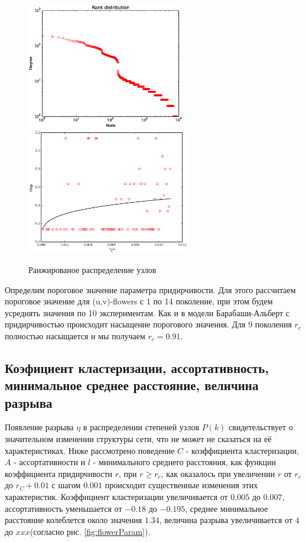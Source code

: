 \documentclass[10pt,aps,pra]{revtex4-1}
\begin{document}
\begin{figure}[H]
\label{fig:flowerRank}
\centering
\includegraphics[height=5.5cm]{pygraph/flowerRank.eps}
\includegraphics[height=5.5cm]{pygraph/flowerGap.eps}
\caption{Ранжированое распределение узлов}
\end{figure}

Определим пороговое значение параметра придирчивости. Для этого рассчитаем пороговое значение для (u,v)-flowers с 1 по 14 поколение, при этом будем усреднять значения по 10 экспериментам. Как и в модели Барабаши-Альберт с придирчивостью происходит насыщение порогового значения. Для 9 поколения $r_c$ полностью насыщается и мы получаем $r_c=0.91$.

\subsection{Коэфициент кластеризации, ассортативность, минимальное среднее расстояние, величина разрыва}
Появление разрыва $\eta$ в распределении степеней узлов $P(k)$ свидетельствует о значительном изменении структуры сети, что не может не сказаться на её характеристиках. Ниже рассмотрено поведение $C$ - коэффициента кластеризации, $A$ - ассортативности и $l$ - минимального среднего расстояния, как функции коэффициента придирчивости $r$, при $r \geq r_c$, как оказалось при увеличении $r$ от $r_c$ до $r_C + 0.01$ с шагом $0.001$ происходит существенные изменения этих характеристик. Коэффициент кластеризации увеличивается от $0.005$ до $0.007$, ассортативность уменьшается от $-0.18$ до $-0.195$, среднее минимальное расстояние колеблется около значения $1.34$, величина разрыва увеличивается от $4$ до $xxx$(согласно рис. \ref{fig:flowerParam}). 
\end{document}
